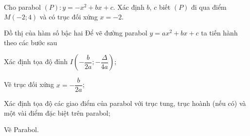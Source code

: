 \begin{vd}%
	Cho parabol $(P)\colon y=-x^2+bx+c$. Xác định $b$, $c$ biết $(P)$ đi qua điểm $M(-2;4)$ và có trục đối xứng $x=-2$.
\end{vd}
\begin{dang}{Đồ thị của hàm số bậc hai}
Để vẽ đường parabol $y=ax^2+bx+c$ ta tiến hành theo các bước sau
\begin{enumEX}{1}
\item Xác định tọa độ đỉnh $I\left(-\dfrac{b}{2a};-\dfrac{\Delta}{4a}\right)$;
\item Vẽ trục đối xứng $x=-\dfrac{b}{2a}$;
\item Xác định tọa độ các giao điểm của parabol với trục tung, trục hoành (nếu có) và một vài điểm đặc biệt trên parabol; 
\item Vẽ Parabol.
\end{enumEX}
\end{dang}
